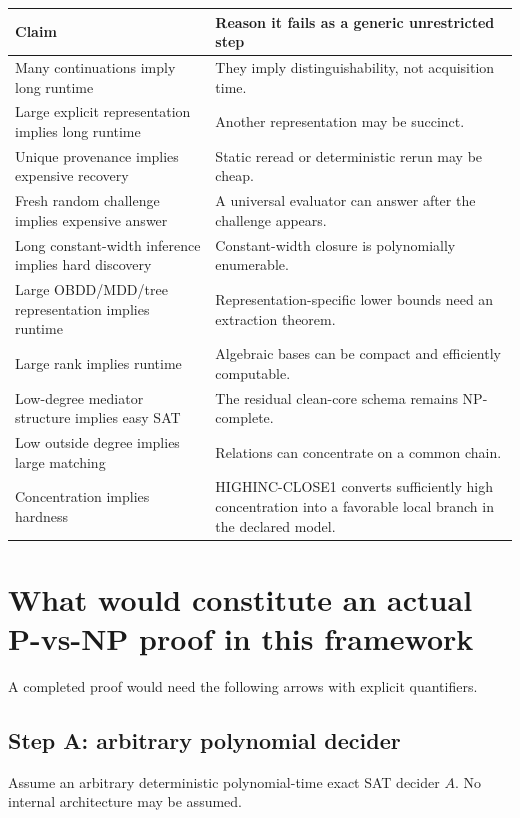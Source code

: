 \documentclass[11pt]{article}
\theoremstyle{plain}
\theoremstyle{definition}
\theoremstyle{remark}
\begin{document}
\begin{longtable}{p{} p{}}
\toprule
\textbf{Claim} & \textbf{Reason it fails as a generic unrestricted step}\\
\midrule
\endhead
Many continuations imply long runtime &
They imply distinguishability, not acquisition time.\\
Large explicit representation implies long runtime &
Another representation may be succinct.\\
Unique provenance implies expensive recovery &
Static reread or deterministic rerun may be cheap.\\
Fresh random challenge implies expensive answer &
A universal evaluator can answer after the challenge appears.\\
Long constant-width inference implies hard discovery &
Constant-width closure is polynomially enumerable.\\
Large OBDD/MDD/tree representation implies runtime &
Representation-specific lower bounds need an extraction theorem.\\
Large rank implies runtime &
Algebraic bases can be compact and efficiently computable.\\
Low-degree mediator structure implies easy SAT &
The residual clean-core schema remains NP-complete.\\
Low outside degree implies large matching &
Relations can concentrate on a common chain.\\
Concentration implies hardness &
HIGHINC-CLOSE1 converts sufficiently high concentration into a favorable
local branch in the declared model.\\
\bottomrule
\end{longtable}

\section{What would constitute an actual P-vs-NP proof in this framework}

A completed proof would need the following arrows with explicit quantifiers.

\subsection{Step A: arbitrary polynomial decider}

Assume an arbitrary deterministic polynomial-time exact SAT decider \(A\).
No internal architecture may be assumed.
\end{document}
